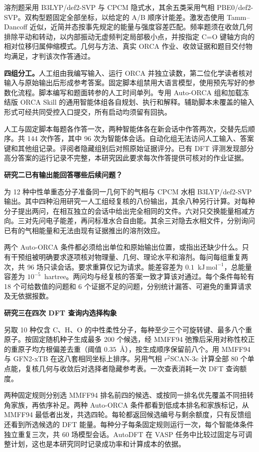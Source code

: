 \documentclass[12pt,a4paper]{article}
\newcommand{\subhead}[1]{\par\addvspace{0.4em}\textbf{#1}\par\nobreak}
\newcommand{\kJmol}{\ensuremath{\mathrm{kJ\,mol^{-1}}}}
\begin{document}
溶剂题采用 B3LYP/def2-SVP 与 CPCM 隐式水，其余五类采用气相 PBE0/def2-SVP。双构型题固定全部坐标，以给定的 A/B 顺序计能差。激发态使用 Tamm--Dancoff 近似，近简并态按事先规定的能量与强度容差匹配。频率题须在收敛几何排除平动和转动，以内部振动无虚频判定局部极小点，并按指定 C=O 键轴方向的相对位移归属伸缩模式。几何与方法、真实 ORCA 作业、收敛证据和题目交付物均满足，才判该次作答通过。

\textbf{四组分工。}人工组由我编写输入、运行 ORCA 并独立读数，第二位化学读者核对输入与原始输出后形成参考答案。固定脚本组禁用大语言模型，使用预先写好的参数化流程。脚本编写和题面转参的人工时间单列。专用 Auto-ORCA 组和加载冻结版 ORCA Skill 的通用智能体组各自规划、执行和解释。辅助脚本未覆盖的输入形式可经共同受控入口提交，所有启动均须留有回执。

人工与固定脚本每题各作答一次，两种智能体各在新会话中作答两次，交替先后顺序。共 144 次作答，其中 96 次为智能体会话。自动化组无法访问人工输入、答案键和其他组记录。评阅者隐藏组别后对照原始证据评分。已有 DFT 评测发现部分高分答案的运行记录不完整\cite{dftbench}，本研究因此要求每次作答提供可核对的作业证据。

\clearpage
\subhead{研究二\quad 已有输出能回答哪些后续问题？}
为 12 种中性单重态分子准备同一几何下的气相与 CPCM 水相 B3LYP/def2-SVP 输出。其中四种沿用研究一人工组经复核的八份输出，其余八种另行计算。对每种分子提出两问，在相互独立的会话中给出完全相同的文件。六对只交换能量相减方向。三对先问电子能差，再问标准水合自由能。其余三对隐去水相文件，分别询问已有的气相能量和无法由现有证据推出的溶剂效应。

两个 Auto-ORCA 条件都必须给出单位和原始输出位置，或指出还缺少什么。只有干预组被明确要求逐项核对物理量、几何、理论水平和溶剂。每问每组重复两次，共 96 场只读会话。要求重算仅记为请求。能差容差为 $0.1$~\kJmol{}，总能量容差为 $10^{-5}$~hartree。两问均与经复核的答案一致才算该对通过。每个条件每轮有 18 个可给数值的问题和 6 个证据不足的问题，分别统计漏答、可避免的重算请求及无依据报数。

\subhead{研究三\quad 在四次 DFT 查询内选择构象}
另取 10 种仅含 C、H、O 的中性柔性分子，每种至少三个可旋转键、最多八个重原子。按固定随机种子生成最多 200 个候选，经 MMFF94 弛豫后采用对称性校正的重原子均方根偏差去重（阈值 $0.35$~\AA），按生成顺序保留前八个。用 MMFF94 与 GFN2-xTB 在这八套相同坐标上排序。另用气相 $r^2$SCAN-3c 计算全部 80 个单点能，复核几何与收敛后对选择者隐藏参考表。一次查表消耗一次 DFT 查询额度。

两种固定规则分别选 MMFF94 排名前四的候选、或按同一排名优先覆盖不同扭转角家族，再依序补足。两种 Auto-ORCA 条件都看到低成本排名和家族标记，从 MMFF94 最低者出发，共选四轮。每轮都返回候选编号与剩余额度，只有反馈组还看到所选候选的 DFT 能量。每种分子每条固定规则运行一次，每个智能体条件独立重复三次，共 60 场模型会话。AutoDFT 在 VASP 任务中比较过固定与可调整计划，这也是本研究同时记录成功率和计算成本的依据\cite{autodft}。
\end{document}
